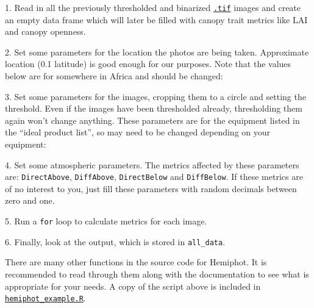 \documentclass{article}
\newcommand\file[1]{\texttt{\underline{#1}}}
\begin{document}
\begin{minipage}{\linewidth}
1. Read in all the previously thresholded and binarized \file{.tif} images and create an empty data frame which will later be filled with canopy trait metrics like LAI and canopy openness.

\end{minipage}


\begin{minipage}{\linewidth}
	2. Set some parameters for the location the photos are being taken. Approximate location (0.1\textdegree{} latitude) is good enough for our purposes. Note that the values below are for somewhere in Africa and should be changed:

\end{minipage}


\begin{minipage}{\linewidth}
3. Set some parameters for the images, cropping them to a circle and setting the threshold. Even if the images have been thresholded already, thresholding them again won't change anything. These parameters are for the equipment listed in the ``ideal product list'', so may need to be changed depending on your equipment:

\end{minipage}


\begin{minipage}{\linewidth}
4. Set some atmospheric parameters. The metrics affected by these parameters are: \verb|DirectAbove|, \verb|DiffAbove|, \verb|DirectBelow| and \verb|DiffBelow|. If these metrics are of no interest to you, just fill these parameters with random decimals between zero and one.

\end{minipage}


\begin{minipage}{\linewidth}
5. Run a \verb|for| loop to calculate metrics for each image.

\end{minipage}

6. Finally, look at the output, which is stored in \verb|all_data|.

There are many other functions in the source code for Hemiphot. It is recommended to read through them along with the documentation to see what is appropriate for your needs. A copy of the script above is included in \file{hemiphot\_example.R}.
\end{document}
